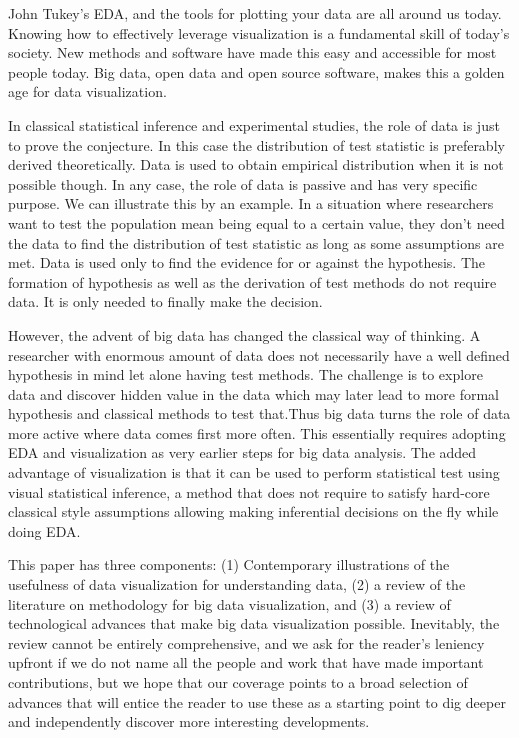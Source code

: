 \documentclass{article}
\begin{document}
John Tukey's EDA, and the tools for plotting your data are all around us today. Knowing how to effectively leverage visualization is a fundamental skill of today's society. New methods and software have made this easy and accessible for most people today. Big data, open data and open source software, makes this a golden age for data visualization.

{\color[rgb]{1,0,0} In classical statistical inference and experimental studies, the role of data is just to prove the conjecture. In this case the distribution of test statistic is preferably derived theoretically. Data is used to obtain empirical distribution when it is not possible though. In any case, the role of data is passive and has very specific purpose. We can illustrate this by an example. In a situation where researchers want to test the population mean being equal to a certain value, they don't need the data to find the distribution of test statistic as long as some assumptions are met. Data is used only to find the evidence for or against the hypothesis. The formation of hypothesis as well as the derivation of test methods do not require data. It is only needed to finally make the decision.

However, the advent of big data has changed the classical way of thinking. A researcher with enormous amount of data does not necessarily have a well defined hypothesis in mind let alone having test methods. The challenge is to explore data and discover hidden value in the data which may later lead to more formal hypothesis and classical methods to test that.Thus big data turns the role of data more active where data comes first more often. This essentially requires adopting EDA and visualization as very earlier steps for big data analysis. The added advantage of visualization is that it can be used to perform statistical test using visual statistical inference, a method that does not require to satisfy hard-core classical style assumptions allowing making inferential decisions on the fly while doing EDA.}

This paper has three components: (1) Contemporary illustrations of the usefulness of data visualization for understanding data, (2) a review of the literature on methodology for big data visualization, and (3) a review of technological advances that make big data visualization possible. Inevitably, the review cannot be entirely comprehensive, and we ask for the reader's leniency upfront if we do not name all the people and work that have made important contributions, but we hope that our coverage points to a broad selection of advances that will entice the reader to use these as a starting point to dig deeper and independently discover more interesting developments.
\end{document}
